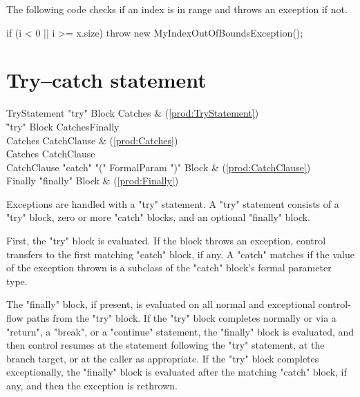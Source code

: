 \begin{ex}
The following code checks if an index is in range and
throws an exception if not.

\begin{xten}
if (i < 0 || i >= x.size)
    throw new MyIndexOutOfBoundsException();
\end{xten}
\end{ex}

\section{Try--catch statement}

\begin{bbgrammar}
        TryStatement \: \xcd"try" Block Catches & (\ref{prod:TryStatement}) \\
                    \| \xcd"try" Block Catches\opt Finally \\
             Catches \: CatchClause & (\ref{prod:Catches}) \\
                    \| Catches CatchClause \\
         CatchClause \: \xcd"catch" \xcd"(" FormalParam \xcd")" Block & (\ref{prod:CatchClause}) \\
             Finally \: \xcd"finally" Block & (\ref{prod:Finally}) \\
\end{bbgrammar}

Exceptions are handled with a \xcd"try" statement.
A \xcd"try" statement consists of a \xcd"try" block, zero or more
\xcd"catch" blocks, and an optional \xcd"finally" block.

First, the \xcd"try" block is evaluated.  If the block throws an
exception, control transfers to the first matching \xcd"catch"
block, if any.  A \xcd"catch" matches if the value of the
exception thrown is a subclass of the \xcd"catch" block's formal
parameter type.

The \xcd"finally" block, if present, is evaluated on all normal
and exceptional control-flow paths from the \xcd"try" block.
If the \xcd"try" block completes normally
or via a \xcd"return", a \xcd"break", or a
\xcd"continue" statement, 
the \xcd"finally"
block is evaluated, and then control resumes at
the statement following the \xcd"try" statement, at the branch target, or at
the caller as appropriate.
If the \xcd"try" block completes
exceptionally, the \xcd"finally" block is evaluated after the
matching \xcd"catch" block, if any, and then the
exception is rethrown.


